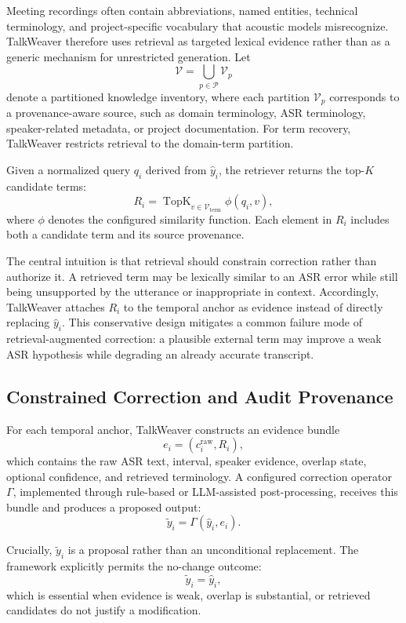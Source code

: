 \documentclass[10pt,twocolumn]{article}
\begin{document}
Meeting recordings often contain abbreviations, named entities, technical terminology, and project-specific vocabulary that acoustic models misrecognize. TalkWeaver therefore uses retrieval as targeted lexical evidence rather than as a generic mechanism for unrestricted generation. Let
\[
\mathcal{V}
=
\bigcup_{p\in\mathcal{P}}
\mathcal{V}_p
\]
denote a partitioned knowledge inventory, where each partition \(\mathcal{V}_p\) corresponds to a provenance-aware source, such as domain terminology, ASR terminology, speaker-related metadata, or project documentation. For term recovery, TalkWeaver restricts retrieval to the domain-term partition.

Given a normalized query \(q_i\) derived from \(\hat{y}_i\), the retriever returns the top-\(K\) candidate terms:
\[
R_i
=
\operatorname{TopK}_{v\in\mathcal{V}_{\mathrm{term}}}
\phi(q_i,v),
\]
where \(\phi\) denotes the configured similarity function. Each element in \(R_i\) includes both a candidate term and its source provenance.

The central intuition is that retrieval should constrain correction rather than authorize it. A retrieved term may be lexically similar to an ASR error while still being unsupported by the utterance or inappropriate in context. Accordingly, TalkWeaver attaches \(R_i\) to the temporal anchor as evidence instead of directly replacing \(\hat{y}_i\). This conservative design mitigates a common failure mode of retrieval-augmented correction: a plausible external term may improve a weak ASR hypothesis while degrading an already accurate transcript.

\subsection{Constrained Correction and Audit Provenance}

For each temporal anchor, TalkWeaver constructs an evidence bundle
\[
e_i
=
\left(
c_i^{\mathrm{raw}},
R_i
\right),
\]
which contains the raw ASR text, interval, speaker evidence, overlap state, optional confidence, and retrieved terminology. A configured correction operator \(\Gamma\), implemented through rule-based or LLM-assisted post-processing, receives this bundle and produces a proposed output:
\[
\tilde{y}_i
=
\Gamma(\hat{y}_i,e_i).
\]

Crucially, \(\tilde{y}_i\) is a proposal rather than an unconditional replacement. The framework explicitly permits the no-change outcome:
\[
\tilde{y}_i=\hat{y}_i,
\]
which is essential when evidence is weak, overlap is substantial, or retrieved candidates do not justify a modification.
\end{document}
